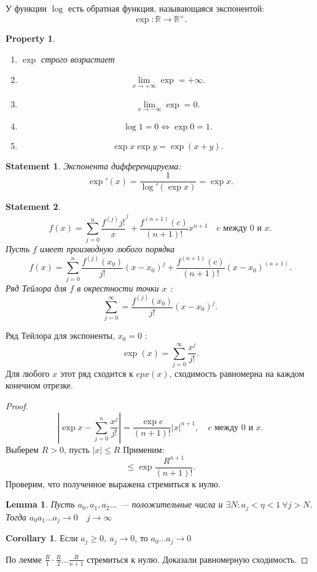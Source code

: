 \documentclass[11pt]{book}
\newcommand{\R}{\mathbb{R}}
\renewcommand{\le}{\leqslant}
\renewcommand{\ge}{\geqslant}
\theoremstyle{definition}
\theoremstyle{plain}
\theoremstyle{plain}
\newtheorem*{lm}{Lemma}
\newtheorem*{st}{Statement}
\newtheorem*{prop}{Property}
\theoremstyle{definition}
\newtheorem*{cor}{Corollary}
\theoremstyle{remark}
\begin{document}
\begin{defn}
    У функции $  \log $ есть обратная функция, называющаяся экспонентой:
    \[
	\exp: \R \to  \R^{+}
    .\]
\end{defn}
\begin{prop}
    \begin{enumerate}
	\item
	    $ \exp$ строго возрастает
	\item
	    \[
		\lim_{x \to +\infty}  \exp = +\infty
	    .\]
	\item
	    \[
		\lim_{x \to -\infty}   \exp = 0
	    .\]
	\item
	    \[
		\log 1 = 0 \Leftrightarrow \exp 0 = 1
	    .\]
	\item
	    \[
		\exp x \exp y = \exp(x+y)
	    .\]
    \end{enumerate}
\end{prop}
\begin{st}
    Экспонента дифференцируема:
    \[
	\exp' (x) = \frac{1}{\log'(\exp x)} = \exp x
    .\]
\end{st}
\begin{st}
    \[
	f(x) = \sum_{j= 0}^{n} \frac{f^{(j)}{j!}}x ^{j} + \frac{f^{(n+1)}(c)}{(n+1)!} x^{n+1} \quad c \text{ между } 0 \text{ и } x
    .\]
    Пусть $ f$ имеет производную любого порядка
    \[
	f(x) = \sum_{j=0} ^{n} \frac{f^{(j)} (x_0)}{j!} (x-x_0)^{j} + \frac{f^{(n+1)}(c) }{(n+1)!} (x-x_0) ^{(n+1)}
    .\]
    Ряд Тейлора для $ f$ в окрестности точки $ x$ :
    \[
	\sum_{j=0}^{\infty} = \frac{f^{(j)} (x_0)}{j!} (x-x_0)^{j}
    .\]
\end{st}
\begin{thm}
    Ряд Тейлора для экспоненты, $ x_0 = 0$ :
    \[
	\exp(x) = \sum_{j=0}^{\infty} \frac{x^{j}}{j!}
    .\]
    Для любого $ x$ этот ряд сходится к $ epx(x)$, сходимость равномерна на каждом конечном отрезке.
\end{thm}
\begin{proof}
    \[
	\left| \exp x - \sum_{j=0}^{n} \frac{x^{j}}{j!}   \right| = \frac{\exp c}{(n+1)!}|x|^{n+1}, \quad c  \text{ между } 0  \text{ и } x
    .\]
    Выберем $ R >0$, пусть $ |x| \le R$
    Применим:
    \[
	\le  \exp \frac{R ^{n+1}}{(n+1)!}
    .\]
    Проверим, что полученное выражена стремиться к нулю.
    \begin{lm}
	Пусть $ a_0, a_1, a_2 \ldots  $ --- положительные числа и $
	\exists N: a_j < \eta < 1 ~ \forall  j > N
	$.
	Тогда $ a_0 a_1 \ldots a_j \to  0 \quad j \to \infty$
    \end{lm}
    \begin{cor}
	Если $ a_j \ge  0, ~ a_j \to  0$, то $ a_0 \ldots a_j \to 0$
    \end{cor}
    По лемме $ \frac{R}{1} \cdot \frac{R}{2} \ldots  \frac{R}{n+1}$ стремиться к нулю. Доказали равномерную сходимость.
\end{proof}
\end{document}
